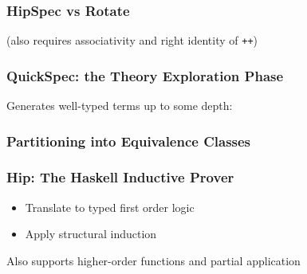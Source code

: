 \documentclass[serif,professionalfont]{beamer}
\newcommand\dn[0]{\vspace{\baselineskip}}
\newcommand\hs[1]{\texttt{#1}}
\begin{document}


\begin{frame}
    \frametitle{HipSpec vs Rotate}

    \rotategen

    \pause
    \begin{center}
    (also requires associativity and right identity of \hs{++})
    \end{center}

\end{frame}

\begin{comment} %
  Prove properties of functional programs using rewriting and
  induction.

  {\color{Purpleee} Problem:} Som properties require lemmas to be proved, that

  \begin{itemize}
    \item Needs to be conjectured,
    \item Requires induction to be proved, and
    \item Might require lemmas themselves
  \end{itemize}
\end{comment}


\begin{frame}
    \frametitle{QuickSpec: the Theory Exploration Phase}
    Generates well-typed terms up to some depth:
    \dn
    
\end{frame}

\begin{frame}[fragile]
    \frametitle{Partitioning into Equivalence Classes}

    


\end{frame}

\begin{frame}[fragile]
  \frametitle{Hip: The Haskell Inductive Prover}

  \begin{itemize}
    \item Translate to typed first order logic
    \item Apply structural induction

  \end{itemize}

  Also supports higher-order functions and partial application
\end{frame}
\end{document}
